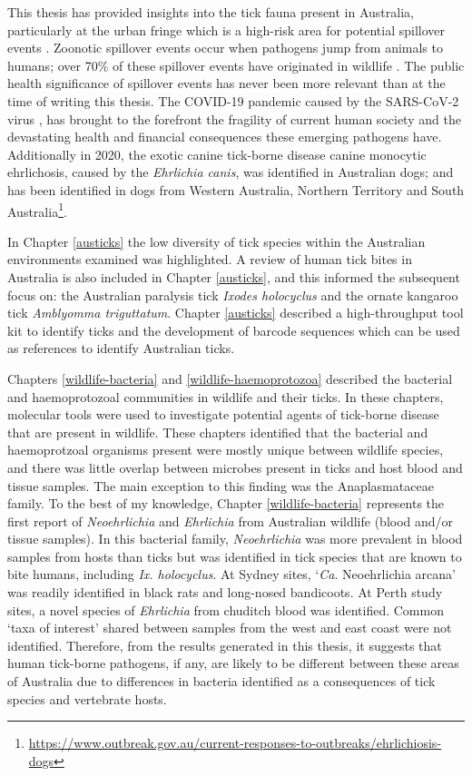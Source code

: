 \documentclass[a4paper, nobind]{templates/ociamthesis}
\begin{document}
This thesis has provided insights into the tick fauna present in Australia, particularly at the urban fringe which is a high-risk area for potential spillover events \autocite{plowrightLandUseinducedSpillover2021}.
Zoonotic spillover events occur when pathogens jump from animals to humans; over 70\% of these spillover events have originated in wildlife \autocite{jonesGlobalTrendsEmerging2008}.
The public health significance of spillover events has never been more relevant than at the time of writing this thesis.
The COVID-19 pandemic caused by the SARS-CoV-2 virus \autocite{luGenomicCharacterisationEpidemiology2020a}, has brought to the forefront the fragility of current human society and the devastating health and financial consequences these emerging pathogens have.
Additionally in 2020, the exotic canine tick-borne disease canine monocytic ehrlichosis, caused by the \emph{Ehrlichia canis}, was identified in Australian dogs; and has been identified in dogs from Western Australia, Northern Territory and South Australia\footnote{\url{https://www.outbreak.gov.au/current-responses-to-outbreaks/ehrlichiosis-dogs}}.

In Chapter \ref{austicks} the low diversity of tick species within the Australian environments examined was highlighted.
A review of human tick bites in Australia is also included in Chapter \ref{austicks}, and this informed the subsequent focus on: the Australian paralysis tick \emph{Ixodes holocyclus} and the ornate kangaroo tick \emph{Amblyomma triguttatum}.
Chapter \ref{austicks} described a high-throughput tool kit to identify ticks and the development of barcode sequences which can be used as references to identify Australian ticks.

Chapters \ref{wildlife-bacteria} and \ref{wildlife-haemoprotozoa} described the bacterial and haemoprotozoal communities in wildlife and their ticks.
In these chapters, molecular tools were used to investigate potential agents of tick-borne disease that are present in wildlife.
These chapters identified that the bacterial and haemoprotzoal organisms present were mostly unique between wildlife species, and there was little overlap between microbes present in ticks and host blood and tissue samples.
The main exception to this finding was the Anaplasmataceae family.
To the best of my knowledge, Chapter \ref{wildlife-bacteria} represents the first report of \emph{Neoehrlichia} and \emph{Ehrlichia} from Australian wildlife (blood and/or tissue samples).
In this bacterial family, \emph{Neoehrlichia} was more prevalent in blood samples from hosts than ticks but was identified in tick species that are known to bite humans, including \emph{Ix. holocyclus}.
At Sydney sites, `\emph{Ca}. Neoehrlichia arcana' was readily identified in black rats and long-nosed bandicoots.
At Perth study sites, a novel species of \emph{Ehrlichia} from chuditch blood was identified. Common `taxa of interest' shared between samples from the west and east coast were not identified.
Therefore, from the results generated in this thesis, it suggests that human tick-borne pathogens, if any, are likely to be different between these areas of Australia due to differences in bacteria identified as a consequences of tick species and vertebrate hosts.
\end{document}
